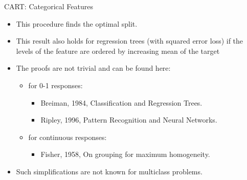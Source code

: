 \documentclass[11pt,compress,t,notes=noshow, xcolor=table]{beamer}
\begin{document}
\begin{vbframe}{CART: Categorical Features}

  \begin{itemize}
  \item This procedure finds the optimal split.
  \item This result also holds for regression trees (with squared error loss) if the levels of the feature are ordered by increasing mean of the target
  \item The proofs are not trivial and can be found here:
    \begin{itemize}
    \item for 0-1 responses:
      \begin{itemize}
      \item Breiman, 1984, Classification and Regression Trees.
      \item Ripley, 1996, Pattern Recognition and Neural Networks.
      \end{itemize}
    \item for continuous responses:
      \begin{itemize}
      \item Fisher, 1958, On grouping for maximum homogeneity.
      \end{itemize}
    \end{itemize}
  \item Such simplifications are not known for multiclass problems.
  \end{itemize}

\end{vbframe}
\end{document}
